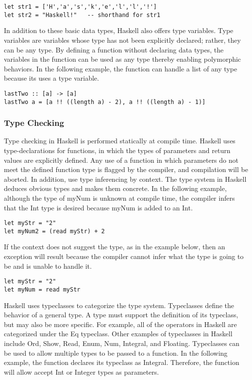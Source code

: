 \documentclass[titlepage,12pt]{article}
\begin{document}
\begin{verbatim}
let str1 = ['H','a','s','k','e','l','l','!']
let str2 = "Haskell!"   -- shorthand for str1
\end{verbatim}

In addition to these basic data types, Haskell also offers type variables. Type variables are variables whose type has 
not been explicitly declared; rather, they can be any type.  By defining a function without declaring data types, the 
variables in the function can be used as any type thereby enabling polymorphic behaviors. In the following example, the 
function can handle a list of any type because its uses a type variable. 

\begin{verbatim}
lastTwo :: [a] -> [a]
lastTwo a = [a !! ((length a) - 2), a !! ((length a) - 1)]
\end{verbatim}

\subsubsection{Type Checking}
Type checking in Haskell is performed statically at compile time. Haskell uses type-declarations for functions, in 
which the types of parameters and return values are explicitly defined. Any use of a function in which parameters 
do not meet the defined function type is flagged by the compiler, and compilation will be aborted. In addition, 
use type inferencing by context. The type system in Haskell deduces obvious types and makes them concrete. In the 
following example, although the type of myNum is unknown at compile time, the compiler infers that the Int type 
is desired because myNum is added to an Int. 

\begin{verbatim}
let myStr = "2" 
let myNum2 = (read myStr) + 2
\end{verbatim}

If the context does not suggest the type, as in the example below, then an exception will result because the 
compiler cannot infer what the type is going to be and is unable to handle it. 

\begin{verbatim}
let myStr = "2" 
let myNum = read myStr
\end{verbatim}

Haskell uses typeclasses to categorize the type system. Typeclasses define the behavior of a general type. 
A type must support the definition of its typeclass, but may also be more specific. For example, all of the 
operators in Haskell are categorized under the Eq typeclass. Other examples of typeclasses in Haskell include Ord, 
Show, Read, Enum, Num, Integral, and Floating. Typeclasses can be used to allow multiple types to be passed to a 
function. In the following example, the function declares its typeclass as Integral. Therefore, the function will 
allow accept Int or Integer types as parameters. 
\end{document}
